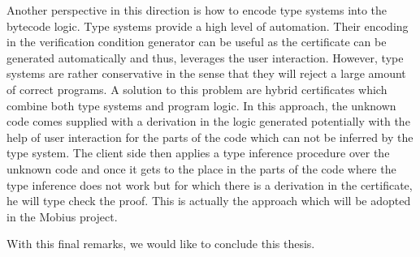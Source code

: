 %  
% 
%        
%     



Another perspective in this direction is how   to encode type systems into the bytecode logic. 
Type systems provide a high level of automation. 
Their encoding in the verification condition generator can be useful as the certificate can be generated
 automatically and thus, leverages the user interaction. However, type systems are rather conservative in the sense 
that they will reject a large amount of correct programs. A solution to this problem are hybrid certificates which combine both type systems and program 
logic. In this approach, the unknown code comes supplied with a  derivation in the logic generated potentially with the help of user interaction 
for the parts of the  code which can not be inferred by the type system.   The client side then applies a type inference procedure over  the
 unknown code and once it gets to the place in the parts of the code where the 
type inference does not work but for which there is a derivation in the certificate, he will type check the proof.   
This is actually the approach which will be adopted in the Mobius project. 

With this final remarks, we would like to conclude this thesis.

